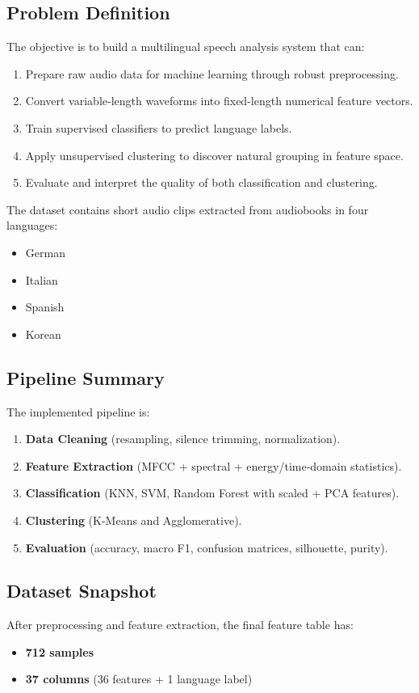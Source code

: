 \documentclass[a4paper,14pt]{extarticle}
\begin{document}
\subsection{Problem Definition}
The objective is to build a multilingual speech analysis system that can:
\begin{enumerate}
    \item Prepare raw audio data for machine learning through robust preprocessing.
    \item Convert variable-length waveforms into fixed-length numerical feature vectors.
    \item Train supervised classifiers to predict language labels.
    \item Apply unsupervised clustering to discover natural grouping in feature space.
    \item Evaluate and interpret the quality of both classification and clustering.
\end{enumerate}

The dataset contains short audio clips extracted from audiobooks in four languages:
\begin{itemize}
    \item German
    \item Italian
    \item Spanish
    \item Korean
\end{itemize}

\subsection{Pipeline Summary}
The implemented pipeline is:
\begin{enumerate}
    \item \textbf{Data Cleaning} (resampling, silence trimming, normalization).
    \item \textbf{Feature Extraction} (MFCC + spectral + energy/time-domain statistics).
    \item \textbf{Classification} (KNN, SVM, Random Forest with scaled + PCA features).
    \item \textbf{Clustering} (K-Means and Agglomerative).
    \item \textbf{Evaluation} (accuracy, macro F1, confusion matrices, silhouette, purity).
\end{enumerate}

\subsection{Dataset Snapshot}
After preprocessing and feature extraction, the final feature table has:
\begin{itemize}
    \item \textbf{712 samples}
    \item \textbf{37 columns} (36 features + 1 language label)
\end{itemize}
\end{document}
